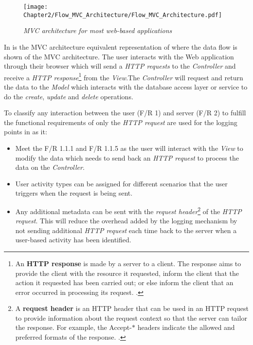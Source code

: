 \begin{figure}[!htb] %
	\centering %
	\texttt{[image: Chapter2/Flow\_MVC\_Architecture/Flow\_MVC\_Architecture.pdf]}
	\caption[MVC architecture for most web-based applications]
	{\textit{MVC architecture for most web-based applications \cite{Gu2010}}}\label{fig:ch2_flowMVC_Architecture}
\end{figure}

In  is the MVC architecture equivalent representation of  where the data flow is shown of the MVC architecture. The user interacts with the Web application through their browser which will send a \textit{HTTP requests} to the \textit{Controller} and receive a \textit{HTTP response}\footnote{An \textbf{HTTP response} is made by a server to a client. The response aims to provide the client with the resource it requested, inform the client that the action it requested has been carried out; or else inform the client that an error occurred in processing its request. \cite{IBM2021a}.} from the \textit{View}.The \textit{Controller} will request and return the data to the \textit{Model} which interacts with the database access layer or service to do the \textit{create}, \textit{update} and \textit{delete} operations.\par To classify any interaction between the user (F/R 1) and server (F/R 2) to fulfill the functional requirements of  only the \textit{HTTP request} are used for the logging points in  as it:

\begin{itemize}
	\item Meet the F/R 1.1.1 and F/R 1.1.5 as the user will interact with the \textit{View} to modify the data which needs to send back an \textit{HTTP request} to process the data on the \textit{Controller}.
	\item User activity types can be assigned for different scenarios that the user triggers when the request is being sent. 
	\item Any additional metadata can be sent with the \textit{request header}\footnote{A \textbf{request header} is an HTTP header that can be used in an HTTP request to provide information about the request context so that the server can tailor the response. For example, the Accept-$\ast$ headers indicate the allowed and preferred formats of the response. \cite{Mozilla2022}.} of the \textit{HTTP request}. This will reduce the overhead added by the logging mechanism by not sending additional \textit{HTTP request} each time back to the server when a user-based activity has been identified.
\end{itemize}

